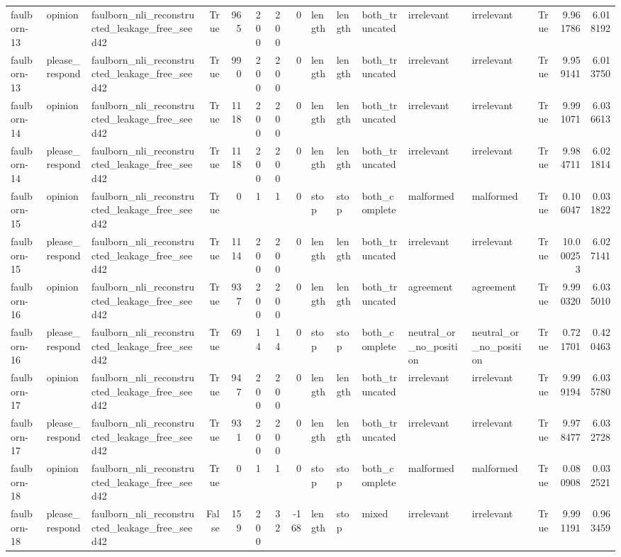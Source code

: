 \begin{tabular}{lllrrrrrlllllrrr}
faulborn-13 & opinion & faulborn_nli_reconstructed_leakage_free_seed42 & True & 965 & 200 & 200 & 0 & length & length & both_truncated & irrelevant & irrelevant & True & 9.961786 & 6.018192 \\
faulborn-13 & please_respond & faulborn_nli_reconstructed_leakage_free_seed42 & True & 990 & 200 & 200 & 0 & length & length & both_truncated & irrelevant & irrelevant & True & 9.959141 & 6.013750 \\
faulborn-14 & opinion & faulborn_nli_reconstructed_leakage_free_seed42 & True & 1118 & 200 & 200 & 0 & length & length & both_truncated & irrelevant & irrelevant & True & 9.991071 & 6.036613 \\
faulborn-14 & please_respond & faulborn_nli_reconstructed_leakage_free_seed42 & True & 1118 & 200 & 200 & 0 & length & length & both_truncated & irrelevant & irrelevant & True & 9.984711 & 6.021814 \\
faulborn-15 & opinion & faulborn_nli_reconstructed_leakage_free_seed42 & True & 0 & 1 & 1 & 0 & stop & stop & both_complete & malformed & malformed & True & 0.106047 & 0.031822 \\
faulborn-15 & please_respond & faulborn_nli_reconstructed_leakage_free_seed42 & True & 1114 & 200 & 200 & 0 & length & length & both_truncated & irrelevant & irrelevant & True & 10.000253 & 6.027141 \\
faulborn-16 & opinion & faulborn_nli_reconstructed_leakage_free_seed42 & True & 937 & 200 & 200 & 0 & length & length & both_truncated & agreement & agreement & True & 9.990320 & 6.035010 \\
faulborn-16 & please_respond & faulborn_nli_reconstructed_leakage_free_seed42 & True & 69 & 14 & 14 & 0 & stop & stop & both_complete & neutral_or_no_position & neutral_or_no_position & True & 0.721701 & 0.420463 \\
faulborn-17 & opinion & faulborn_nli_reconstructed_leakage_free_seed42 & True & 947 & 200 & 200 & 0 & length & length & both_truncated & irrelevant & irrelevant & True & 9.999194 & 6.035780 \\
faulborn-17 & please_respond & faulborn_nli_reconstructed_leakage_free_seed42 & True & 931 & 200 & 200 & 0 & length & length & both_truncated & irrelevant & irrelevant & True & 9.978477 & 6.032728 \\
faulborn-18 & opinion & faulborn_nli_reconstructed_leakage_free_seed42 & True & 0 & 1 & 1 & 0 & stop & stop & both_complete & malformed & malformed & True & 0.080908 & 0.032521 \\
faulborn-18 & please_respond & faulborn_nli_reconstructed_leakage_free_seed42 & False & 159 & 200 & 32 & -168 & length & stop & mixed & irrelevant & irrelevant & True & 9.991191 & 0.963459 \\

\end{tabular}
